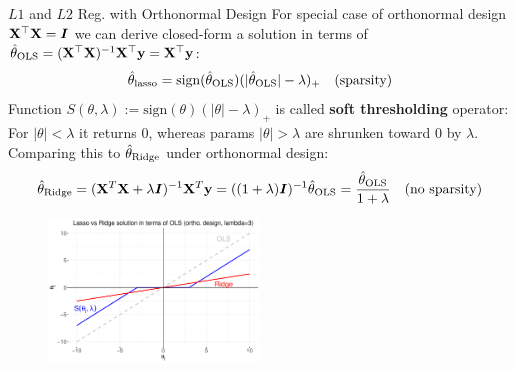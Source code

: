 \documentclass[11pt,compress,t,notes=noshow, xcolor=table]{beamer}
\begin{document}
\begin{vbframe}{$L1$ and $L2$ Reg. with Orthonormal Design}
\small For special case of orthonormal design $\mathbf{X}^{\top}\mathbf{X}=\boldsymbol{I}$ we can derive closed-form a solution in terms of $\hat{\theta}_{\text{OLS}}=(\mathbf{X}^{\top}\mathbf{X})^{-1}\mathbf{X}^{\top}\mathbf{y}=\mathbf{X}^{\top}\mathbf{y}$:
\vspace{-0.1cm}
$$\thetah_{\text{lasso}}=\text{sign}(\thetah_{\text{OLS}})(\vert \thetah_{\text{OLS}} \vert - \lambda)_{+}\quad(\text{sparsity})\vspace{-0.1cm}$$
Function $S(\theta,\lambda):=\text{sign}(\theta)(|\theta|-\lambda)_{+}$ is called \textbf{soft thresholding} operator: For $|\theta|<\lambda$ it returns $0$, whereas params $|\theta|>\lambda$ are shrunken toward $0$ by $\lambda$.\\
Comparing this to $\hat{\theta}_{\text{Ridge}}$ under orthonormal design: %
\vspace{-0.3cm}
$$\thetah_{\text{Ridge}}= ({\Xmat}^T \Xmat  + \lambda \id)^{-1} \Xmat^T\yv=((1+\lambda)\id)^{-1}\thetah_{\text{OLS}} = \frac{\thetah_{\text{OLS}}}{1+\lambda}\quad (\text{no sparsity})\vspace{-0.22cm}$$
\vspace{-0.16cm}
\begin{figure}
\includegraphics[width=0.5\textwidth]{figure_man/soft-thresholding.pdf}\\
\end{figure}

\end{vbframe}
\end{document}
